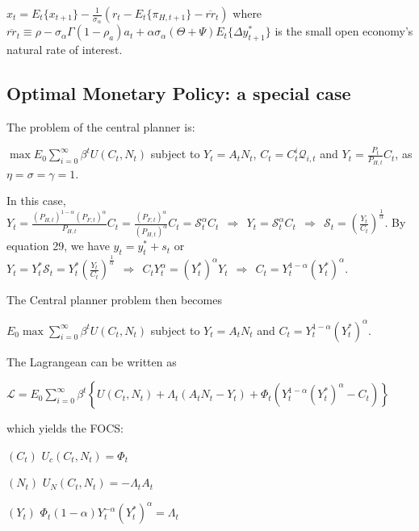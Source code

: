 \documentclass[
]{article}
\begin{document}
\(\displaystyle x_t = E_t\{x_{t+1}\} -\frac{1}{\sigma_\alpha}(r_t-E_t\{\pi_{H,t+1}\} -\overline{rr}_t)\)
where
\(\overline{rr}_t \equiv \rho-\sigma_\alpha \Gamma (1-\rho_a)a_t +\alpha \sigma_\alpha(\Theta+\Psi) E_t\{\Delta y_{t+1}^*\}\)
is the small open economy's natural rate of interest.

\vspace{12pt}

\hypertarget{optimal-monetary-policy-a-special-case}{%
\subsection{Optimal Monetary Policy: a special
case}\label{optimal-monetary-policy-a-special-case}}

The problem of the central planner is:

\(\displaystyle \max E_0\sum_{i=0}^\infty \beta^t U(C_t,N_t)\) subject
to \(Y_t=A_tN_t\), \(\displaystyle C_t=C_t^i\mathcal{Q}_{i,t}\) and
\(\displaystyle Y_t=\frac{P_t}{P_{H,t}} C_t\), as
\(\eta=\sigma=\gamma=1\).

In this case,
\(\displaystyle Y_t=\frac{(P_{H,t})^{1-\alpha}(P_{F,t})^{\alpha}}{P_{H,t}} C_t = \frac{(P_{F,t})^{\alpha}}{(P_{H,t})^{\alpha}}C_t=\mathcal{S}_t^{\alpha}C_t \ \ \Rightarrow \ \ Y_t=\mathcal{S}_t^{\alpha}C_t \ \ \Rightarrow \ \ \mathcal{S}_t= \left( \frac{Y_t}{C_t} \right)^{\frac{1}{\alpha}}\).
By equation 29, we have \(y_t=y_t^*+s_t\) or
\(\displaystyle Y_t=Y_t^{*} \mathcal{S}_t= Y_t^{*} \left( \frac{Y_t}{C_t} \right)^{\frac{1}{\alpha}} \ \ \Rightarrow \ \ C_t Y_t^\alpha = (Y_t^*)^\alpha Y_t \ \ \Rightarrow \ \ C_t=Y_t^{1-\alpha}(Y_t^*)^\alpha\).

The Central planner problem then becomes

\(\displaystyle E_0\max \sum_{i=0}^\infty \beta^t U(C_t,N_t)\) subject
to \(Y_t=A_tN_t\) and \(C_t=Y_t^{1-\alpha}(Y_t^*)^\alpha\).

The Lagrangean can be written as

\(\displaystyle \mathcal{L}= E_0 \sum_{i=0}^\infty \beta^t \left\{ U(C_t,N_t) +\Lambda_t(A_t N_t - Y_t) + \Phi_t \left( Y_t^{1-\alpha}(Y_t^*)^\alpha -C_t \right) \right\}\)

which yields the FOCS:

\((C_t)\) \(U_c(C_t,N_t)=\Phi_t\)

\((N_t)\) \(U_N(C_t,N_t)=-\Lambda_t A_t\)

\((Y_t)\) \(\Phi_t (1-\alpha)Y_t^{-\alpha}(Y_t^*)^\alpha =\Lambda_t\)
\end{document}
